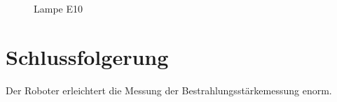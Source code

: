 \documentclass[a4paper,bibtotoc,oneside]{scrbook}
\begin{document}
\begin{figure}
\caption{Lampe E10}
\end{figure} 





 





\section{Schlussfolgerung}\thispagestyle{empty}

Der Roboter erleichtert die Messung der Bestrahlungsstärkemessung enorm.  








\end{document}

